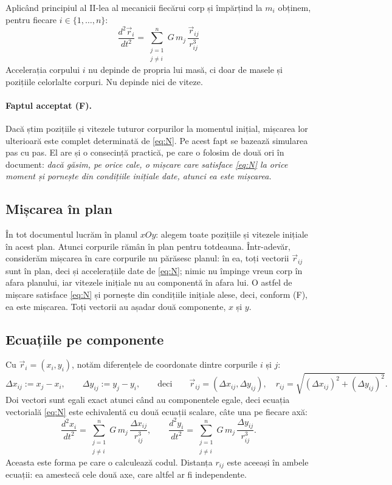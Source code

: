 \documentclass[11pt,a4paper]{article}
\newcommand{\vr}{\vec r}
\newcommand{\odd}[1]{\frac{d^{2} #1}{d t^{2}}}
\begin{document}
Aplicând principiul al II-lea al mecanicii fiecărui corp și împărțind la $m_i$ obținem, pentru fiecare $i \in \{1, \dots, n\}$:
\begin{equation}
  \boxed{\;\odd{\vr_i} = \sum_{\substack{j=1\\ j\neq i}}^{n} G\,m_j\,\frac{\vr_{ij}}{r_{ij}^{3}}\;} \label{eq:N}
\end{equation}
Accelerația corpului $i$ nu depinde de propria lui masă, ci doar de masele și pozițiile celorlalte corpuri. Nu depinde nici de viteze.

\paragraph{Faptul acceptat (F).} Dacă știm pozițiile și vitezele tuturor corpurilor la momentul inițial, mișcarea lor ulterioară este complet determinată de \eqref{eq:N}. Pe acest fapt se bazează simularea pas cu pas. El are și o consecință practică, pe care o folosim de două ori în document: \emph{dacă găsim, pe orice cale, o mișcare care satisface \eqref{eq:N} la orice moment și pornește din condițiile inițiale date, atunci ea este mișcarea.}

\subsection*{Mișcarea în plan}
În tot documentul lucrăm în planul $xOy$: alegem toate pozițiile și vitezele inițiale în acest plan. Atunci corpurile rămân în plan pentru totdeauna. Într-adevăr, considerăm mișcarea în care corpurile nu părăsesc planul: în ea, toți vectorii $\vr_{ij}$ sunt în plan, deci și accelerațiile date de \eqref{eq:N}; nimic nu împinge vreun corp în afara planului, iar vitezele inițiale nu au componentă în afara lui. O astfel de mișcare satisface \eqref{eq:N} și pornește din condițiile inițiale alese, deci, conform (F), ea este mișcarea. Toți vectorii au așadar două componente, $x$ și $y$.

\subsection*{Ecuațiile pe componente}
Cu $\vr_i = (x_i, y_i)$, notăm diferențele de coordonate dintre corpurile $i$ și $j$:
\[
  \Delta x_{ij} := x_j - x_i, \qquad \Delta y_{ij} := y_j - y_i, \qquad\text{deci}\qquad \vr_{ij} = (\Delta x_{ij}, \Delta y_{ij}), \quad r_{ij} = \sqrt{(\Delta x_{ij})^2 + (\Delta y_{ij})^2}.
\]
Doi vectori sunt egali exact atunci când au componentele egale, deci ecuația vectorială \eqref{eq:N} este echivalentă cu două ecuații scalare, câte una pe fiecare axă:
\begin{equation}
  \odd{x_i} = \sum_{\substack{j=1\\ j\neq i}}^{n} G\,m_j\,\frac{\Delta x_{ij}}{r_{ij}^{3}}, \qquad
  \odd{y_i} = \sum_{\substack{j=1\\ j\neq i}}^{n} G\,m_j\,\frac{\Delta y_{ij}}{r_{ij}^{3}}. \label{eq:comp}
\end{equation}
Aceasta este forma pe care o calculează codul. Distanța $r_{ij}$ este aceeași în ambele ecuații: ea amestecă cele două axe, care altfel ar fi independente.
\end{document}
